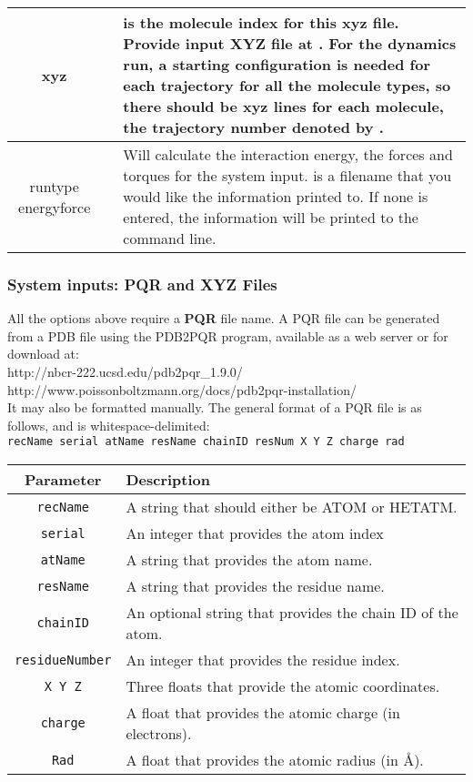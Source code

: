 \begin{tabular}{ c | l | l}
\T xyz & \parbox[t]{\coltwo}{   }& \parbox[t]{\colthree}{ is the molecule index for this xyz file. Provide input XYZ file at . For the dynamics run, a starting configuration is needed for each trajectory for all the molecule types, so there should be  xyz lines for each molecule, the trajectory number denoted by . \B} \\
\hline
\T runtype energyforce &   & \parbox[t]{\colthree}{Will calculate the interaction energy, the forces and torques for the system input.  is a filename that you would like the information printed to. If none is entered, the information will be printed to the command line.\B}  \\
\hline
  \end{tabular}
  
  \clearpage

\subsubsection{System inputs: PQR and XYZ Files}

All the options above require a \textbf{PQR} file name. A PQR file can be generated from a PDB file using the PDB2PQR program, available as a web server or for download at: \\

http://nbcr-222.ucsd.edu/pdb2pqr\_1.9.0/  \\
http://www.poissonboltzmann.org/docs/pdb2pqr-installation/ \\

It may also be formatted manually. The general format of a PQR file is as follows, and is whitespace-delimited: \\

\texttt{recName  serial  atName  resName  chainID  resNum  X  Y  Z  charge rad }\\

  \begin{tabular}{ c | l  }
    \textbf{Parameter} & \textbf{Description} \\ \hline
\texttt{recName} 	&	A string that should either be ATOM or HETATM. \\
\texttt{serial} 	&	An integer that provides the atom index \\
\texttt{atName} 	&	A string that provides the atom name.\\
\texttt{resName}	&	A string that provides the residue name. \\
\texttt{chainID}	&	An optional string that provides the chain ID of the atom.\\
\texttt{residueNumber}  & An integer that provides the residue index.\\
\texttt{X Y Z}	& Three floats that provide the atomic coordinates.\\
\texttt{charge}	& A float that provides the atomic charge (in electrons). \\
\texttt{Rad}		& A float that provides the atomic radius (in \AA).\\
    \hline
  \end{tabular}

